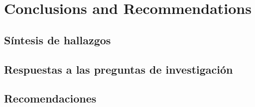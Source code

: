 \chapter{Conclusions and Recommendations} %
    \section{Síntesis de hallazgos}
    \section{Respuestas a las preguntas de investigación}
    \section{Recomendaciones}
